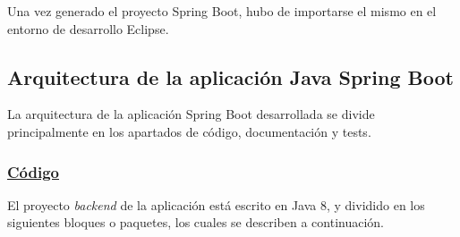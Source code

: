      \FloatBarrier

    Una vez generado el proyecto Spring Boot, hubo de importarse el mismo en el entorno de desarrollo Eclipse.
    
    
    \subsection{Arquitectura de la aplicación Java Spring Boot}
    La arquitectura de la aplicación Spring Boot desarrollada se divide principalmente en los apartados de código, documentación y tests.

        \subsubsection{\underline{Código}}
        El proyecto \textit{backend} de la aplicación está escrito en Java 8, y dividido en los siguientes bloques o paquetes, los cuales se describen a continuación.
        
